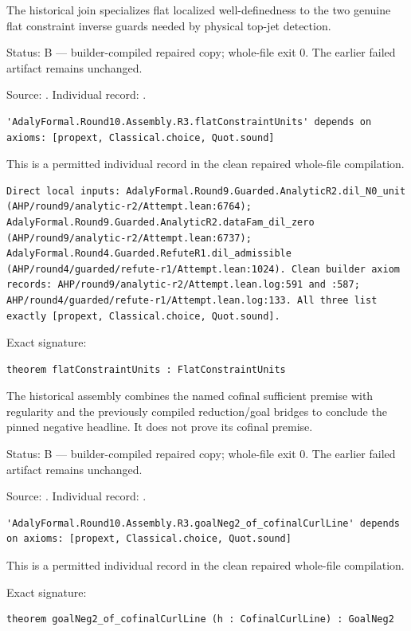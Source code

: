 \begin{theorem}
\label{join-5}
\uses{}
\leanok
The historical join specializes flat localized well-definedness to the two genuine flat constraint inverse guards needed by physical top-jet detection.
\par Status: B — builder-compiled repaired copy; whole-file exit 0. The earlier failed artifact remains unchanged.
\par Source: \texttt{}. Individual record: \texttt{}.
\begin{verbatim}
'AdalyFormal.Round10.Assembly.R3.flatConstraintUnits' depends on axioms: [propext, Classical.choice, Quot.sound]
\end{verbatim}
This is a permitted individual record in the clean repaired whole-file compilation.
\begin{verbatim}
Direct local inputs: AdalyFormal.Round9.Guarded.AnalyticR2.dil_N0_unit (AHP/round9/analytic-r2/Attempt.lean:6764); AdalyFormal.Round9.Guarded.AnalyticR2.dataFam_dil_zero (AHP/round9/analytic-r2/Attempt.lean:6737); AdalyFormal.Round4.Guarded.RefuteR1.dil_admissible (AHP/round4/guarded/refute-r1/Attempt.lean:1024). Clean builder axiom records: AHP/round9/analytic-r2/Attempt.lean.log:591 and :587; AHP/round4/guarded/refute-r1/Attempt.lean.log:133. All three list exactly [propext, Classical.choice, Quot.sound].
\end{verbatim}
\par Exact signature:
\begin{verbatim}
theorem flatConstraintUnits : FlatConstraintUnits
\end{verbatim}
\end{theorem}

\begin{theorem}
\label{join-6}
\leanok
The historical assembly combines the named cofinal sufficient premise with regularity and the previously compiled reduction/goal bridges to conclude the pinned negative headline. It does not prove its cofinal premise.
\par Status: B — builder-compiled repaired copy; whole-file exit 0. The earlier failed artifact remains unchanged.
\par Source: \texttt{}. Individual record: \texttt{}.
\begin{verbatim}
'AdalyFormal.Round10.Assembly.R3.goalNeg2_of_cofinalCurlLine' depends on axioms: [propext, Classical.choice, Quot.sound]
\end{verbatim}
This is a permitted individual record in the clean repaired whole-file compilation.
\par Exact signature:
\begin{verbatim}
theorem goalNeg2_of_cofinalCurlLine (h : CofinalCurlLine) : GoalNeg2
\end{verbatim}
\end{theorem}

